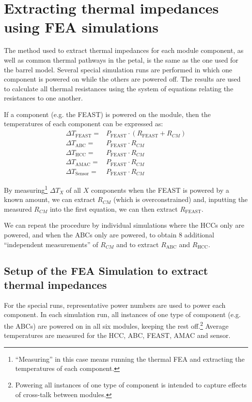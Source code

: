 
\section{ Extracting thermal impedances using FEA simulations}

The method used to extract thermal impedances for each module component, as well as common thermal
pathways in the petal, is the same as the one used for the barrel model. Several special simulation
runs are performed in which one component is powered on while the others are powered off. The results
are used to calculate all thermal resistances using the system of equations relating the resistances
to one another.

If a component (e.g. the FEAST) is powered on the module, then the temperatures of each component
can be expressed as:
%
\begin{align}
\Delta T_\text{FEAST} =& P_\text{FEAST} \cdot (R_\text{FEAST} + R_{CM}) \label{eq:powered}\\
\Delta T_\text{ABC}   =& P_\text{FEAST} \cdot R_{CM}\\
\Delta T_\text{HCC}   =& P_\text{FEAST} \cdot R_{CM}\\
\Delta T_\text{AMAC}  =& P_\text{FEAST} \cdot R_{CM}\\
\Delta T_\text{Sensor}=& P_\text{FEAST} \cdot R_{CM}
\end{align}

By measuring\footnote{
``Measuring'' in this case means running the thermal FEA and extracting the temperatures of each
component.
} $\Delta T_{X}$ of all $X$ components when the FEAST is powered by a known amount, we can
extract $R_{CM}$ (which is overconstrained) and, inputting the measured $R_{CM}$ into the first
equation, we can then extract $R_\text{FEAST}$.

We can repeat the procedure by individual simulations where the HCCs only are powered, and when the
ABCs only are powered, to obtain 8 additional ``independent measurements'' of $R_{CM}$ and to
extract $R_\text{ABC}$ and $R_\text{HCC}$.

\subsection{Setup of the FEA Simulation to extract thermal impedances}

For the special runs,
representative power numbers are used to power each component. In each simulation run, all instances
of one type of component (e.g. the ABCs) are powered on in all six modules, keeping the rest
off.\footnote{Powering all instances of one type of component is intended to capture effects of
cross-talk between modules.}
Average temperatures are measured for the HCC, ABC, FEAST, AMAC and sensor.

